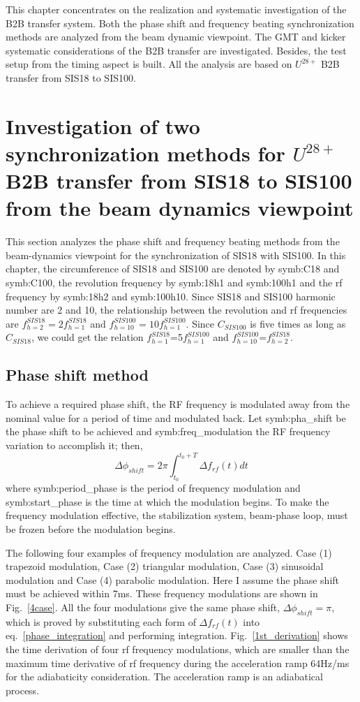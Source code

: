 This chapter concentrates on the realization and systematic investigation of the \gls{B2B} transfer system. Both the phase shift and frequency beating synchronization methods are analyzed from the beam dynamic viewpoint. The \gls{GMT} and kicker systematic considerations of the B2B transfer are investigated. Besides, the test setup from the timing aspect is built. All the analysis are based on $U^{28+}$ B2B transfer from SIS18 to SIS100.
\section{Investigation of two synchronization methods for $U^{28+}$ B2B transfer from SIS18 to SIS100 from the beam dynamics viewpoint }
This section analyzes the phase shift and frequency beating methods from the beam-dynamics viewpoint for the synchronization of SIS18 with SIS100. In this chapter, the circumference of SIS18 and SIS100 are denoted by \gls{symb:C18} and \gls{symb:C100}, the revolution frequency by \gls{symb:18h1} and \gls{symb:100h1} and the rf frequency by \gls{symb:18h2} and \gls{symb:100h10}. Since SIS18 and SIS100 harmonic number are 2 and 10, the relationship between the revolution and rf frequencies are $f_{h=2}^{SIS18}=2f_{h=1}^{SIS18}$ and $f_{h=10}^{SIS100}=10f_{h=1}^{SIS100}$. Since $C_{SIS100}$ is five times as long as $C_{SIS18}$, we could get the relation  $f_{h=1}^{SIS18}$=5$f_{h=1}^{SIS100}$ and $f_{h=10}^{SIS100}$=$f_{h=2}^{SIS18}$.
\subsection{Phase shift method}
To achieve a required phase shift, the \gls{RF} frequency is modulated away from the nominal value for a period of time and modulated back. Let \gls{symb:pha_shift} be the phase shift to be achieved and \gls{symb:freq_modulation} the RF frequency variation to accomplish it; then,
\begin{equation}
\Delta \phi_{shift}= 2\pi \int_{t_0}^{t_0+T} \Delta f_{rf}(t)dt \label{phase_integration}
\end{equation}
where \gls{symb:period_phase} is the period of frequency modulation and \gls{symb:start_phase} is the time at which the modulation begins. To make the frequency modulation effective, the stabilization system, beam-phase loop, must be frozen before the modulation begins. 

The following four examples of frequency modulation are analyzed. Case (1) trapezoid modulation, Case (2) triangular modulation, Case (3) sinusoidal modulation and Case (4) parabolic modulation. Here I assume the phase shift must be achieved within 7ms. These frequency modulations are shown in Fig.~\ref{4case}. All the four modulations give the same phase shift, $\Delta \phi_{shift}=\pi$, which is
proved by substituting each form of $\Delta f_{rf}(t)$ into eq.~\ref{phase_integration} and performing integration. Fig.~\ref{1st_derivation} shows the time derivation of four rf frequency modulations, which are smaller than the maximum time derivative of rf frequency during the acceleration ramp 64Hz/ms for the adiabaticity consideration. The acceleration ramp is an adiabatical process.

